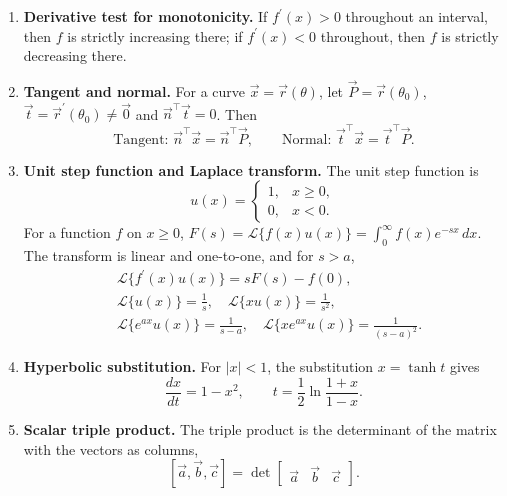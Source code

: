 \begin{enumerate}[label=\normalfont 1.1.\arabic*.,ref=1.1.\arabic*]
\item \label{formula-1-1-6} \textbf{Derivative test for monotonicity.} If $f^{\prime}(x)>0$ throughout an interval, then $f$ is strictly increasing there; if $f^{\prime}(x)<0$ throughout, then $f$ is strictly decreasing there.
\item \label{formula-1-1-7} \textbf{Tangent and normal.} For a curve $\vec{x}=\vec{r}(\theta)$, let $\vec{P}=\vec{r}(\theta_0)$, $\vec{t}=\vec{r}^{\prime}(\theta_0)\ne\vec{0}$ and $\vec{n}^{\top}\vec{t}=0$. Then
\begin{equation*}\tag{1.1.7.1}
\text{Tangent: }\vec{n}^{\top}\vec{x}=\vec{n}^{\top}\vec{P},\qquad
\text{Normal: }\vec{t}^{\top}\vec{x}=\vec{t}^{\top}\vec{P}.
\end{equation*}
\item \label{formula-1-1-8} \textbf{Unit step function and Laplace transform.} The unit step function is
\begin{equation*}\tag{1.1.8.1}
u(x)=\begin{cases}1,&x\ge0,\\0,&x<0.\end{cases}
\end{equation*}
For a function $f$ on $x\ge0$, $F(s)=\mathcal{L}\{f(x)u(x)\}=\int_0^{\infty}f(x)e^{-sx}\,dx$. The transform is linear and one-to-one, and for $s>a$,
\begin{equation*}\tag{1.1.8.2}
\begin{aligned}
&\mathcal{L}\{f^{\prime}(x)u(x)\}=sF(s)-f(0),\\
&\mathcal{L}\{u(x)\}=\frac{1}{s},\quad
\mathcal{L}\{xu(x)\}=\frac{1}{s^2},\\
&\mathcal{L}\{e^{ax}u(x)\}=\frac{1}{s-a},\quad
\mathcal{L}\{xe^{ax}u(x)\}=\frac{1}{(s-a)^2}.
\end{aligned}
\end{equation*}
\item \label{formula-1-1-9} \textbf{Hyperbolic substitution.} For $|x|<1$, the substitution $x=\tanh t$ gives
\begin{equation*}\tag{1.1.9.1}
\frac{dx}{dt}=1-x^2,\qquad t=\frac{1}{2}\ln\frac{1+x}{1-x}.
\end{equation*}
\item \label{formula-1-1-10} \textbf{Scalar triple product.} The triple product is the determinant of the matrix with the vectors as columns,
\begin{equation*}\tag{1.1.10.1}
[\vec{a},\vec{b},\vec{c}]=\det\begin{bmatrix}\vec{a}&\vec{b}&\vec{c}\end{bmatrix}.

\end{equation*}
\end{enumerate}
